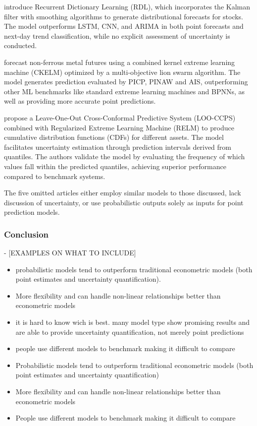 \textcite{Sharma2021} introduce Recurrent Dictionary Learning (RDL), which incorporates the Kalman filter with smoothing algorithms to generate distributional forecasts for stocks. The model outperforms LSTM, CNN, and ARIMA in both point forecasts and next-day trend classification, while no explicit assessment of uncertainty is conducted.

\textcite{Guo2022} forecast non-ferrous metal futures using a combined kernel extreme learning machine (CKELM) optimized by a multi-objective lion swarm algorithm. The model generates prediction evaluated by PICP, PINAW and AIS, outperforming other ML benchmarks like standard extreme learning machines and BPNNs, as well as providing more accurate point predictions.

\cite{wang2020fastconformal} propose a Leave-One-Out Cross-Conformal Predictive System (LOO-CCPS) combined with Regularized Extreme Learning Machine (RELM) to produce cumulative distribution functions (CDFs) for different assets. The model facilitates uncertainty estimation through prediction intervals derived from quantiles. The authors validate the model by evaluating the frequency of which values fall within the predicted quantiles, achieving superior performance compared to benchmark systems. 

The five omitted articles either employ similar models to those discussed, lack discussion of uncertainty, or use probabilistic outputs solely as inputs for point prediction models.





\subsubsection{Conclusion} %
- [EXAMPLES ON WHAT TO INCLUDE]
\begin{itemize}
    \item  probabilistic models tend to outperform traditional econometric models (both point estimates and uncertainty quantification). 
    \item More flexibility and can handle non-linear relationships better than econometric models
    \item it is hard to know wich is best. many model type show promising results and are able to provide uncertainty quantification, not merely point predictions 
    \item people use different models to benchmark making it difficult to compare 
     \item Probabilistic models tend to outperform traditional econometric models (both point estimates and uncertainty quantification)
    \item More flexibility and can handle non-linear relationships better than econometric models
    \item People use different models to benchmark making it difficult to compare
\end{itemize}

